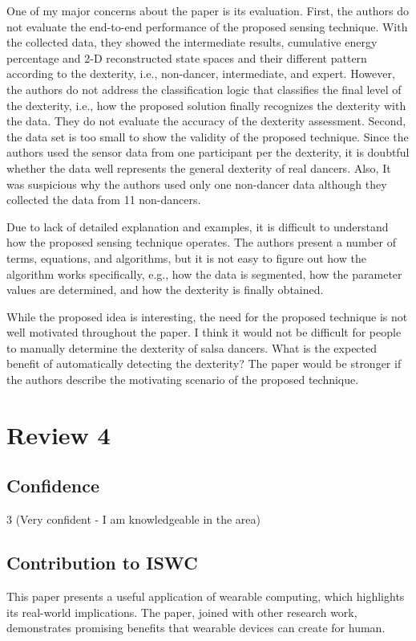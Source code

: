 \documentclass[8pt]{article}
\begin{document}
   One of my major concerns about the paper is its evaluation. First, the
   authors do not evaluate the end-to-end performance of the proposed
   sensing technique. With the collected data, they showed the intermediate
   results, cumulative energy percentage and 2-D reconstructed state spaces
   and their different pattern according to the dexterity, i.e., non-dancer,
   intermediate, and expert. However, the authors do not address the
   classification logic that classifies the final level of the dexterity,
   i.e., how the proposed solution finally recognizes the dexterity with the
   data. They do not evaluate the accuracy of the dexterity assessment.
   Second, the data set is too small to show the validity of the proposed
   technique. Since the authors used the sensor data from one participant
   per the dexterity, it is doubtful whether the data well represents the
   general dexterity of real dancers. Also, It was suspicious why the
   authors used only one non-dancer data although they collected the data
   from 11 non-dancers.

   Due to lack of detailed explanation and examples, it is difficult to
   understand how the proposed sensing technique operates. The authors
   present a number of terms, equations, and algorithms, but it is not easy
   to figure out how the algorithm works specifically, e.g., how the data is
   segmented, how the parameter values are determined, and how the dexterity
   is finally obtained.

   While the proposed idea is interesting, the need for the proposed
   technique is not well motivated throughout the paper. I think it would
   not be difficult for people to manually determine the dexterity of salsa
   dancers. What is the expected benefit of automatically detecting the
   dexterity? The paper would be stronger if the authors describe the
   motivating scenario of the proposed technique.

   
   
\section{Review 4}

\subsection{Confidence}
   3  (Very confident - I am knowledgeable in the area)
   
\subsection{Contribution to ISWC}
   This paper presents a useful application of wearable computing, which
   highlights its real-world implications. The paper, joined with other
   research work, demonstrates promising benefits that wearable devices can
   create for human.
\end{document}
